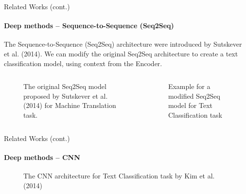 \begin{frame}{Related Works (cont.)}
\framesubtitle{Deep methods -- Sequence-to-Sequence (Seq2Seq)}
The Sequence-to-Sequence (Seq2Seq) architecture were introduced by Sutskever et al. (2014)\cite{Sutskever2014}. We can modify the original Seq2Seq architecture to create a text classification model, using context from the Encoder.
\begin{columns}
\begin{column}{.5\textwidth}
\begin{figure}
\centering
{}
\caption{The original Seq2Seq model proposed by Sutskever et al. (2014) for Machine Translation task\cite{Sutskever2014}.}
\end{figure}
\end{column}
\begin{column}{.5\textwidth}
\begin{figure}
\centering
{}
\caption{Example for a modified Seq2Seq model for Text Classification task}
\end{figure}
\end{column}
\end{columns}
\end{frame}

\begin{frame}{Related Works (cont.)}
\framesubtitle{Deep methods -- CNN}
\begin{figure}
\centering
{}
\caption{The CNN architecture for Text Classification task by Kim et al. (2014)\cite{Kim2014}}
\end{figure}
\end{frame}

